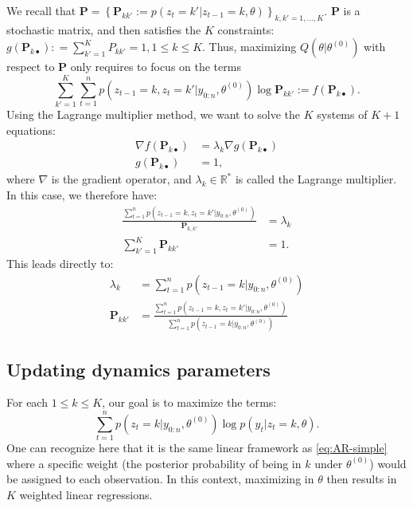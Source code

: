 \documentclass[
]{book}
\begin{document}
We recall that \(\mathbf{P} = \left \lbrace\mathbf{P}_{kk'} := p(z_{t} = k' \vert z_{t - 1} = k, \theta) \right\rbrace_{k,k' = 1,\dots, K}\). \(\mathbf{P}\) is a stochastic matrix, and then satisfies the \(K\) constraints:
\(g(\mathbf{P}_{k\bullet}): = \sum_{k'=1}^K P_{kk'} = 1, 1\leq k \leq K\).
Thus, maximizing \(Q(\theta \vert \theta^{(0)})\) with respect to \(\mathbf{P}\) only requires to focus on the terms
\[\sum_{k' = 1}^K \sum_{t = 1}^ np(z_{t-1} = k, z_{t} = k'\vert y_{0:n}, \theta^{(0)}) \log \mathbf{P}_{kk'} := f(\mathbf{P}_{k\bullet}).\]
Using the Lagrange multiplier method, we want to solve the \(K\) systems of \(K + 1\) equations:
\begin{align*}
\nabla f(\mathbf{P}_{k\bullet}) &= \lambda_k \nabla g(\mathbf{P}_{k\bullet})\\
g(\mathbf{P}_{k\bullet}) &= 1,
\end{align*}
where \(\nabla\) is the gradient operator, and \(\lambda_k \in \mathbb{R}^*\) is called the Lagrange multiplier. In this case, we therefore have:
\begin{align*}
\frac{\sum_{t = 1}^n p(z_{t-1} = k, z_{t} = k'\vert y_{0:n}, \theta^{(0)})}{\mathbf{P}_{k,k'}} &= \lambda_k \\
\sum_{k' = 1}^K{\mathbf{P}_{kk'}} &= 1.
\end{align*}
This leads directly to:
\begin{align*}
\lambda_k &= \sum_{t = 1}^n p(z_{t - 1} = k \vert y_{0:n}, \theta^{(0)}) \\
\mathbf{P}_{kk'} &= \frac{\sum_{t = 1}^n p(z_{t - 1} = k, z_{t} = k'\vert y_{0:n}, \theta^{(0)}) }{\sum_{t = 1}^n p(z_{t - 1} = k \vert y_{0:n}, \theta^{(0)})}
\end{align*}

\hypertarget{updating-dynamics-parameters}{%
\subsection*{Updating dynamics parameters}\label{updating-dynamics-parameters}}

For each \(1\leq k \leq K\), our goal is to maximize the terms:
\[\sum_{t = 1}^n p(z_t = k\vert y_{0:n}, \theta^{(0)}) \log p(y_{t} \vert z_{t} = k, \theta).\]
One can recognize here that it is the same linear framework as \eqref{eq:AR-simple} where a specific weight (the posterior probability of being in \(k\) under \(\theta^{(0)}\)) would be assigned to each observation.
In this context, maximizing in \(\theta\) then results in \(K\) weighted linear regressions.
\end{document}
